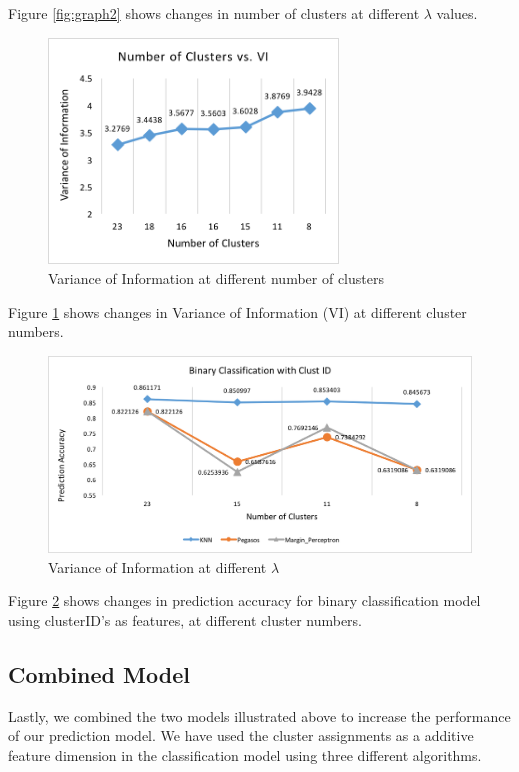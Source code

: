 \documentclass[11pt,letterpaper]{article}
\begin{document}
Figure \ref{fig:graph2} shows changes in number of clusters at different $\lambda$ values.

\begin{figure}
  \includegraphics[width=\linewidth,height=6cm]{3_cluster_vs_VI.png}
  \caption{Variance of Information at different number of clusters}
  \label{fig:graph3}
\end{figure}

Figure \ref{fig:graph3} shows changes in Variance of Information (VI) at different cluster numbers.


\begin{figure}
  \includegraphics[width=\linewidth]{4_binary_classification_with_cluster_id.png}
  \caption{Variance of Information at different $\lambda$}
  \label{fig:graph4}
\end{figure}

Figure \ref{fig:graph4} shows changes in prediction accuracy for binary classification model using clusterID's as features, at different cluster numbers.

\pagebreak

\subsection{Combined Model}
Lastly, we combined the two models illustrated above to increase the performance of our prediction model. We have used the cluster assignments as a additive feature dimension in the classification model using three different algorithms.
\end{document}
